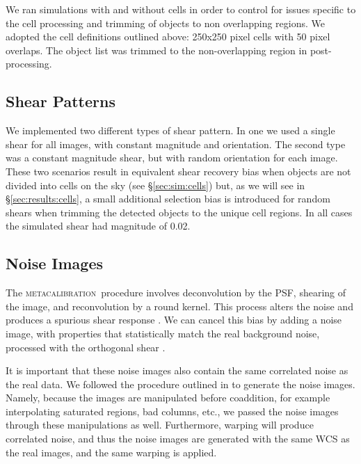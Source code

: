 \documentclass[twocolumn,twocolappendix,astrosym]{openjournal}
\newcommand{\mcal}{\textsc{metacalibration}}
\newcommand{\mshear}{0.02}
\begin{document}
We ran simulations with and without cells in order to control for issues
specific to the cell processing and trimming of objects to non overlapping
regions.  We adopted the cell definitions outlined above: 250x250 pixel cells
with 50 pixel overlaps. The object list was trimmed to the non-overlapping
region in post-processing.

\subsection{Shear Patterns} \label{sec:sim:shears}

We implemented two different types of shear pattern.  In one we used a single
shear for all images, with constant magnitude and orientation.  The second type
was a constant magnitude shear, but with random orientation for each image.
These two scenarios result in equivalent shear recovery bias when objects are
not divided into cells on the sky (see \S \ref{sec:sim:cells}) but, as we will
see in \S \ref{sec:results:cells}, a small additional selection bias is
introduced for random shears when trimming the detected objects to the unique
cell regions.  In all cases the simulated shear had magnitude of \mshear.

\subsection{Noise Images} \label{sec:sim:noiseimages}

The \mcal\ procedure involves deconvolution by the PSF, shearing of the image,
and reconvolution by a round kernel.  This process alters the noise and
produces a spurious shear response \citep{SheldonMcal2017}.  We can cancel this
bias by adding a noise image, with properties that statistically match the real
background noise, processed with the orthogonal shear
\citep{SheldonMcal2017,mdet20}.

It is important that these noise images also contain the same correlated noise
as the real data. We followed the procedure outlined in \citet{BeckerMdetCoadd}
to generate the noise images. Namely, because the images are manipulated before
coaddition, for example interpolating saturated regions, bad columns, etc., we
passed the noise images through these manipulations as well. Furthermore,
warping will produce correlated noise, and thus the noise images are generated
with the same WCS as the real images, and the same warping is applied.
\end{document}
